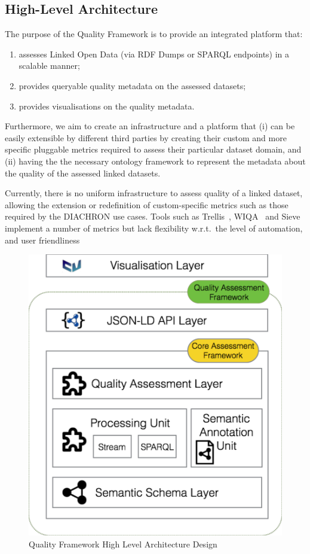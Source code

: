 
\subsection{High-Level Architecture}
\label{sec:HLA} 

The purpose of the Quality Framework is to provide an integrated platform that: 
\begin{enumerate}
\item assesses Linked Open Data (via RDF Dumps or SPARQL endpoints) in a scalable manner;
\item provides queryable quality metadata on the assessed datasets;
\item provides visualisations on the quality metadata.
\end{enumerate}
Furthermore, we aim to create an infrastructure and a platform that (i) can be easily extensible by different third parties by creating their custom and more specific pluggable metrics required to assess their particular dataset domain, and (ii) having the the necessary ontology framework to represent the metadata about the quality of the assessed linked datasets.

Currently, there is no uniform infrastructure to assess quality of a linked dataset, allowing the extension or redefinition of custom-specific metrics such as those required by the DIACHRON use cases.
Tools such as Trellis~\cite{Gil2002}, WIQA~\cite{Bizer2008:PhDThesis:biblatex} and Sieve~\cite{Mendes2012} implement a number of metrics but lack flexibility w.r.t.\ the level of automation, and user friendliness~\cite{Zaveri2012:LODQ} 

\begin{figure}[tbph]
\center
\includegraphics[scale=0.3]{images/qualityFrameworkHLA.pdf} 
\caption{Quality Framework High Level Architecture Design} 
\label{fig:qualityFramework}
\end{figure}

